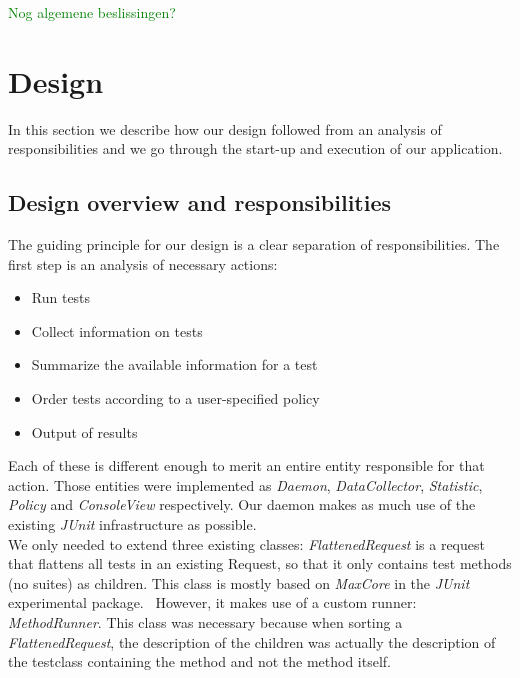 \documentclass[i2]{oss}
\newcommand{\class}[1]{\emph{#1}}
\newcommand{\junit}{\emph{JUnit }}
\newcommand{\comment}[1]{{\huge \textcolor{green}{#1}}\\}
\begin{document}
\comment{Nog algemene beslissingen?}

\section{Design}
\label{ssec:design}

In this section we describe how our design followed from an analysis
of responsibilities and we go through the start-up and execution of 
our application.\\

\subsection{Design overview and responsibilities}
\label{subssec: Design overview}

The guiding principle for our design is a clear separation of 
responsibilities. The first step is an analysis of necessary actions:\\

\begin{itemize}
	\item Run tests
    \item Collect information on tests
    \item Summarize the available information for a test
    \item Order tests according to a user-specified policy
    \item Output of results
\end{itemize}

Each of these is different enough to merit an entire entity responsible 
for that action. Those entities were implemented as \class{Daemon},
\class{DataCollector}, \class{Statistic}, \class{Policy} and
\class{ConsoleView} respectively. Our daemon makes as much use of the 
existing \junit infrastructure as possible. \\

We only needed to extend three existing classes: \class{FlattenedRequest}
is a request that flattens all tests in an existing Request, so that it only contains test methods (no suites) as children. 
This class is mostly based on \class{MaxCore} in the \junit experimental package. \
However, it makes use of a custom runner: \class{MethodRunner}. 
This class was necessary because when sorting a \class{FlattenedRequest}, the description of the children was actually the
description of the testclass containing the method and not the method 
itself.\\
\end{document}
